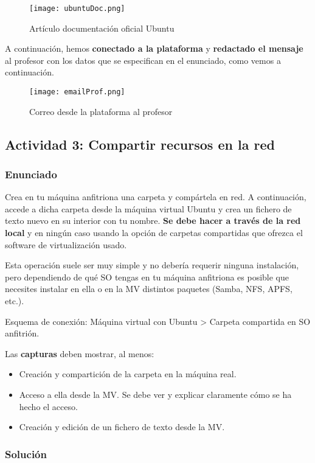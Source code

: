 \begin{figure}[H]
    \centering
    \texttt{[image: ubuntuDoc.png]}
    \caption{Artículo documentación oficial Ubuntu}
\end{figure}

A continuación, hemos \textbf{conectado a la plataforma} y \textbf{redactado el mensaje} al profesor con los datos que se especifican en el enunciado, como vemos a continuación.

\begin{figure}[H]
    \centering
    \texttt{[image: emailProf.png]}
    \caption{Correo desde la plataforma al profesor}
\end{figure}

\subsection{Actividad 3: Compartir recursos en la red}

\subsubsection{Enunciado}
Crea en tu máquina anfitriona una carpeta y compártela en red. A continuación, accede a dicha carpeta desde la máquina virtual Ubuntu y crea un fichero de texto nuevo en su interior con tu nombre. \textbf{Se debe hacer a través de la red local} y en ningún caso usando la opción de carpetas compartidas que ofrezca el software de virtualización usado.

Esta operación suele ser muy simple y no debería requerir ninguna instalación, pero dependiendo de qué SO tengas en tu máquina anfitriona es posible que necesites instalar en ella o en la MV distintos paquetes (Samba, NFS, APFS, etc.).

Esquema de conexión: Máquina virtual con Ubuntu > Carpeta compartida en SO anfitrión.

Las \textbf{capturas} deben mostrar, al menos:

\begin{itemize}
    \item Creación y compartición de la carpeta en la máquina real.
    \item Acceso a ella desde la MV. Se debe ver y explicar claramente cómo se ha hecho el acceso.
    \item Creación y edición de un fichero de texto desde la MV.
\end{itemize}

\subsubsection{Solución}







%
%

